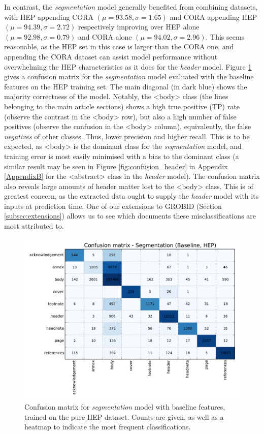 In contrast, the \emph{segmentation} model generally benefited from combining datasets, with HEP appending CORA $(\mu = 93.58, \sigma = 1.65)$ and CORA appending HEP $(\mu = 94.39, \sigma = 2.72)$ respectively improving over HEP alone $(\mu = 92.98, \sigma = 0.79)$ and CORA alone $(\mu = 94.02, \sigma = 2.96)$. This seems reasonable, as the HEP set in this case is larger than the CORA one, and appending the CORA dataset can assist model performance without overwhelming the HEP characteristics as it does for the \emph{header} model. Figure \ref{fig:segmentation_baseline_confusion} gives a confusion matrix for the \emph{segmentation} model evaluated with the baseline features on the HEP training set. The main diagonal (in dark blue) shows the majority correctness of the model. Notably, the <body> class (the lines belonging to the main article sections) shows a high true positive (TP) rate (observe the contrast in the <body> row), but also a high number of false positives (observe the confusion in the <body> column), equivalently, the false \emph{negatives} of other classes. Thus, lower precision and higher recall. This is to be expected, as <body> is the dominant class for the \emph{segmentation} model, and training error is most easily minimised with a bias to the dominant class (a similar result may be seen in Figure \ref{fig:confusion_header} in Appendix \ref{AppendixB} for the <abstract> class in the \emph{header} model). The confusion matrix also reveals large amounts of header matter lost to the <body> class. This is of greatest concern, as the extracted data ought to supply the \emph{header} model with its inputs at prediction time. One of our extensions to GROBID (Section \ref{subsec:extensions}) allows us to see which documents these misclassifications are most attributed to.

\begin{figure}[h]
\center
\includegraphics[width=5.5in]{Figures/baseline_confusion_segmentation.pdf}
\caption{Confusion matrix for \emph{segmentation} model with baseline features, trained on the pure HEP dataset. Counts are given, as well as a heatmap to indicate the most frequent classifications.}
\label{fig:segmentation_baseline_confusion}
\end{figure}

